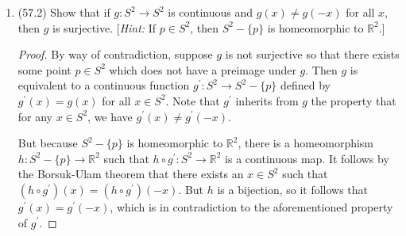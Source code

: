 \documentclass[11pt]{article}
\begin{document}
\begin{enumerate}
\begin{proof}
      To show that $h$ maps a point $y$ to its antipode $-y$, we can show that the composition $a\circ h$, where $a$ is the antipode map which sends $x$ to $-x$ (this map is continuous since this map is continuous in $\mathbb{C}$), has a fixed point. If such a fixed point $y$ exists for $a\circ h$, then $y = (a\circ h)(y) = a(h(y)) = -h(y)$ which implies that $h(y) = -y$.

      It is sufficient to show that $a\circ h$ is homotopic to $h$ itself: Let $H \colon S^1\times I\to S^1$ be the homotopy given by $H(x,t) = \exp(\pi i t)h(x)$ (continuous since product of continuous maps are continuous), where $H(x,0) = h(x)$ and $H(x,1) = -h(x) = (a\circ h)(x)$. Then since $h$ is nulhomotopic, it follows $a\circ h$ is nulhomotopic as well so that it has a fixed point $y$. Hence $h(y) = -y$, so that $h$ maps a point to its antipode.
    \end{proof}
    \item (57.2) Show that if $g\colon S^2\to S^2$ is continuous and $g(x)\neq g(-x)$ for all $x$, then $g$ is surjective. [\textit{Hint:} If $p\in S^2$, then $S^2 - \{p\}$ is homeomorphic to $\mathbb{R}^2$.]
    \begin{proof}
      By way of contradiction, suppose $g$ is not surjective so that there exists some point $p\in S^2$ which does not have a preimage under $g$. Then $g$ is equivalent to a continuous function $g^{\prime}\colon S^2\to S^2-\{p\}$ defined by $g^{\prime}(x) = g(x)$ for all $x\in S^2$. Note that $g^{\prime}$ inherits from $g$ the property that for any $x\in S^2$, we have $g^{\prime}(x)\neq g^{\prime}(-x)$.

      But because $S^2-\{p\}$ is homeomorphic to $\mathbb{R}^2$, there is a homeomorphism $h\colon S^2-\{p\}\to \mathbb{R}^2$ such that $h\circ g^{\prime}\colon S^2\to \mathbb{R}^2$ is a continuous map. It follows by the Borsuk-Ulam theorem that there exists an $x\in S^2$ such that $(h\circ g^{\prime})(x) = (h\circ g^{\prime})(-x)$. But $h$ is a bijection, so it follows that $g^{\prime}(x) = g^{\prime}(-x)$, which is in contradiction to the aforementioned property of $g^{\prime}$.


\end{proof}
\end{enumerate}
\end{document}
